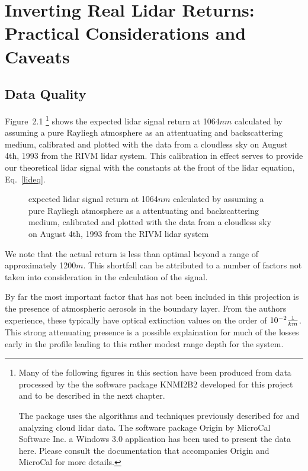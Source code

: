 \chapter{Inverting Real Lidar Returns: Practical Considerations and
Caveats}

\section{Data Quality}

Figure~{2.1} \footnote{Many of the following figures in this section 
have been produced from data processed
by the the software package KNMI2B2 developed for this project 
and to be described in the next chapter. 

The package uses the algorithms and techniques previously 
described for and analyzing cloud lidar data. The software 
package Origin by MicroCal Software Inc. a Windows 3.0
application has been used to present the data here. 
Please consult the documentation that accompanies
Origin and MicroCal for more details.} shows the expected lidar 
signal return at 
1064$nm$ calculated by assuming a pure Rayliegh 
atmosphere as an attentuating and backscattering
medium, calibrated and plotted with the data from a cloudless sky
on August 4th, 1993 from the RIVM lidar system. This calibration
in effect serves to provide our theoretical lidar signal with
the constants at the front of the lidar equation, Eq.~{\ref{lideq}}. 

\begin{figure}
\vspace{5.0in}
\caption{expected lidar signal return at 
1064$nm$ calculated by assuming a pure Rayliegh 
atmosphere as a attentuating and backscattering
medium, calibrated and plotted with the data from a cloudless sky
on August 4th, 1993 from the RIVM lidar system}
\end{figure}

We note that the actual return is less than optimal beyond
a range of approximately 1200$m$. This shortfall can be attributed
to a number of factors not taken into consideration in the
calculation of the signal.

By far the most important factor that has not been included
in this projection is the presence of atmospheric aerosols 
in the boundary layer. From the authors experience, these typically 
have optical extinction values on the
order of ${10^{-2}}{1\over{km}}$. This strong attenuating 
presence is a possible explaination for much of the losses 
early in the profile leading to this rather modest range depth for the system. 

